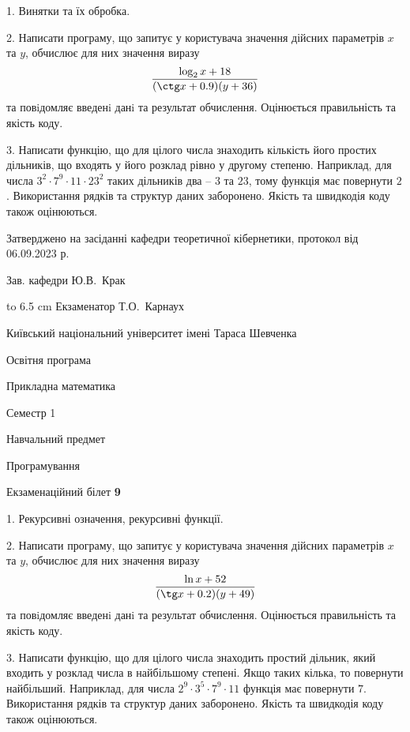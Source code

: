 \documentclass[12pt, ukrainian]{article}
\begin{document}
{%
1. Винятки та їх обробка.%
\par
2. Написати програму, що запитує у користувача значення дійсних параметрів $x$ та $y$, обчислює для них значення виразу 
$$\frac{\log_{2} x + 18}{(\ctg x + 0.9) (y + 36)}$$ 
та повiдомляє введенi данi та результат обчислення.
 Оцінюється правильність та якість коду.

\par
3. Написати функцію, що для цілого числа знаходить кількість його простих дільників, що входять у його розклад рівно у другому степеню. Наприклад, для числа $3^2{\cdot}7^9{\cdot}11{\cdot}23^{2}$ таких дільників два – $3$ та $23$, тому функція має повернути $2$.  Використання рядків та структур даних заборонено. Якість та швидкодія коду також оцінюються. 

}
{\smallskip\smallskip \begin {scriptsize} Затверджено на засіданні кафедри теоретичної кібернетики, протокол   від   06.09.2023 р.\par\smallskip\smallskip\smallskip\smallskip
{\parbox {6.5 cm} {Зав. кафедри \dotfill Ю.В.~Крак}}\hspace {0.7cm} {\hbox to 6.5 cm { Екзаменатор \dotfill Т.О.~Карнаух}} \end{scriptsize}}
\vspace{0.9cm}
{{\begin {scriptsize}\par
{ \center  Київський національний університет імені Тараса Шевченка \par}
{\parbox {5 cm}{Освітня програма \hfill}{\parbox {7 cm}{Прикладна математика\hfill}}\parbox {6 cm}{\hfill Семестр 1}}\par
{\parbox {5 cm} {Навчальний предмет \hfill}\parbox {7 cm}{Програмування \hfill}\parbox {6cm}{\hfill}\par}\vspace{-15pt} \end{scriptsize}}{\center Екзаменаційний білет \No \textbf { 9 }\par}}
{%
1. Рекурсивні означення, рекурсивні функції.%
\par
2. Написати програму, що запитує у користувача значення дійсних параметрів $x$ та $y$, обчислює для них значення виразу 
$$\frac{\ln x + 52}{(\tg x + 0.2) (y + 49)}$$ 
та повiдомляє введенi данi та результат обчислення.
 Оцінюється правильність та якість коду.

\par
3. Написати функцію, що для цілого числа знаходить простий дільник, який входить у розклад числа в найбільшому степені. Якщо таких кілька, то повернути найбільший. Наприклад, для числа $2^{9}{\cdot}3^5{\cdot}7^9{\cdot}11$ функція має повернути $7$.  Використання рядків та структур даних заборонено. Якість та швидкодія коду також оцінюються. 

}
\end{document}
